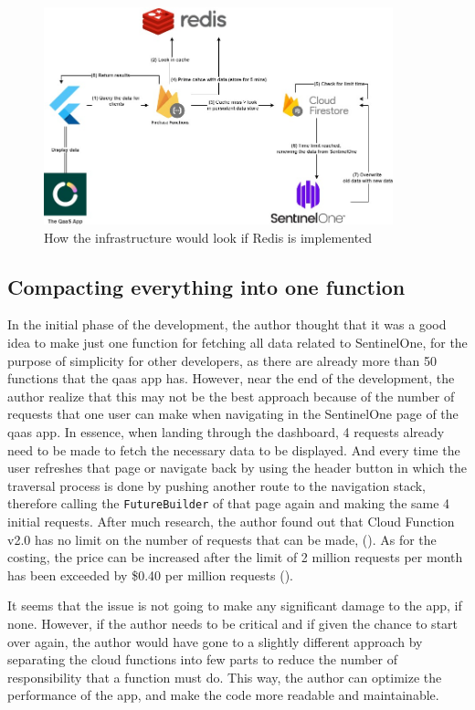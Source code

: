 \begin{figure}[htbp]
  \centering
  \includegraphics[width=0.9\textwidth]{Figures/Redis Caching.jpg}
  \caption{How the infrastructure would look if Redis is implemented}
\end{figure}


\subsection{Compacting everything into one function}

In the initial phase of the development, the author thought that it was a good idea to make just one function for fetching all data
related to SentinelOne, for the purpose of simplicity for other developers, as there are already more than 50 functions that the
\acrshort{qaas} app has. However, near the end of the development, the author realize that this may not be the best approach because
of the number of requests that one user can make when navigating in the SentinelOne page of the \acrshort{qaas} app. In essence,
when landing through the dashboard, 4 requests already need to be made to fetch the necessary data to be displayed. And every time
the user refreshes that page or navigate back by using the header button in which the traversal process is done by pushing another
route to the navigation stack, therefore calling the \texttt{FutureBuilder} of that page again and making the same 4 initial requests.
After much research, the author found out that Cloud Function v2.0 has no limit on the number of requests that can be made,
(\textit{\cite{firebaseCloudFunctionLimit}}). As for the costing, the price can be increased after the limit of 2 million requests
per month has been exceeded by \$0.40 per million requests (\textit{\cite{pricing}}).

It seems that the issue is not going to make any significant damage to the app, if none. However, if the author needs to be
critical and if given the chance to start over again, the author would have gone to a slightly different approach by separating
the cloud functions into few parts to reduce the number of responsibility that a function must do. This way, the author can
optimize the performance of the app, and make the code more readable and maintainable.

